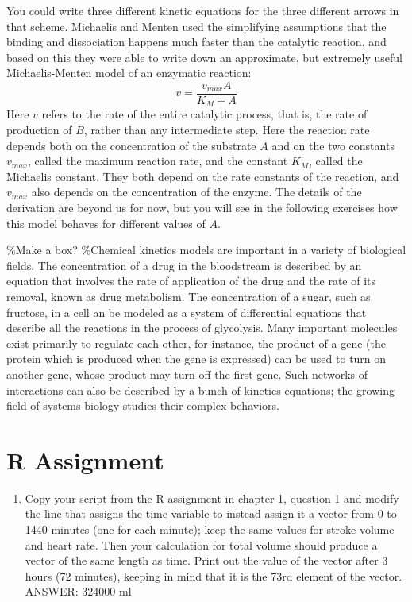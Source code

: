 \documentclass[
]{book}
\providecommand{\tightlist}{%
  \setlength{\itemsep}{0pt}\setlength{\parskip}{0pt}}
\theoremstyle{definition}
\theoremstyle{definition}
\theoremstyle{definition}
\theoremstyle{remark}
\begin{document}
You could write three different kinetic equations for the three different arrows in that scheme. Michaelis and Menten used the simplifying assumptions that the binding and dissociation happens much faster than the catalytic reaction, and based on this they were able to write down an approximate, but extremely useful Michaelis-Menten model of an enzymatic reaction:
\begin{equation}
v = \frac{v_{max} A}{K_M+A}
\label{eq:kinetics_MM_kinetics}
\end{equation}
Here \(v\) refers to the rate of the entire catalytic process, that is, the rate of production of \(B\), rather than any intermediate step. Here the reaction rate depends both on the concentration of the substrate \(A\) and on the two constants \(v_{max}\), called the maximum reaction rate, and the constant \(K_M\), called the Michaelis constant. They both depend on the rate constants of the reaction, and \(v_{max}\) also depends on the concentration of the enzyme. The details of the derivation are beyond us for now, but you will see in the following exercises how this model behaves for different values of \(A\).

\%Make a box?
\%Chemical kinetics models are important in a variety of biological fields. The concentration of a drug in the bloodstream is described by an equation that involves the rate of application of the drug and the rate of its removal, known as drug metabolism. The concentration of a sugar, such as fructose, in a cell an be modeled as a system of differential equations that describe all the reactions in the process of glycolysis. Many important molecules exist primarily to regulate each other, for instance, the product of a gene (the protein which is produced when the gene is expressed) can be used to turn on another gene, whose product may turn off the first gene. Such networks of interactions can also be described by a bunch of kinetics equations; the growing field of systems biology studies their complex behaviors.

\hypertarget{r-assignment-1}{%
\section{R Assignment}\label{r-assignment-1}}

\begin{enumerate}
\def\labelenumi{\arabic{enumi}.}
\tightlist
\item
  Copy your script from the R assignment in chapter 1, question 1 and modify the line that assigns the time variable to instead assign it a vector from 0 to 1440 minutes (one for each minute); keep the same values for stroke volume and heart rate. Then your calculation for total volume should produce a vector of the same length as time. Print out the value of the vector after 3 hours (72 minutes), keeping in mind that it is the 73rd element of the vector. ANSWER: 324000 ml
\end{enumerate}
\end{document}
